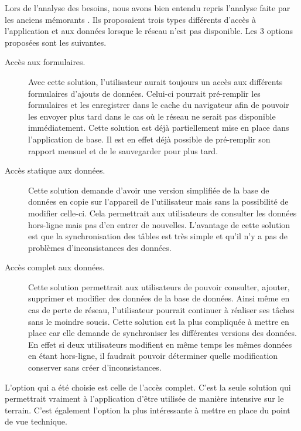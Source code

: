\documentclass{EPL-master-thesis-covers-FR}
\begin{document}
			Lors de l'analyse des besoins, nous avons bien entendu repris l'analyse faite par les anciens mémorants \cite{ref:haitiwater}. Ils proposaient trois types différents d'accès à l'application et aux données lorsque le réseau n'est pas disponible. Les 3 options proposées sont les suivantes. 
			\begin{description}
				\item[Accès aux formulaires.] Avec cette solution, l'utilisateur aurait toujours un accès aux différents formulaires d'ajouts de données. Celui-ci pourrait pré-remplir les formulaires et les enregistrer dans le cache du navigateur afin de pouvoir les envoyer plus tard dans le cas où le réseau ne serait pas disponible immédiatement. Cette solution est déjà partiellement mise en place dans l'application de base. Il est en effet déjà possible de pré-remplir son rapport mensuel et de le sauvegarder pour plus tard. %
				\item[Accès statique aux données.] Cette solution demande d'avoir une version simplifiée de la base de données en copie sur l'appareil de l'utilisateur mais sans la possibilité de modifier celle-ci. Cela permettrait aux utilisateurs de consulter les données hors-ligne mais pas d'en entrer de nouvelles. L'avantage de cette solution est que la synchronisation des tâbles est très simple et qu'il n'y a pas de problèmes d'inconsistances des données.
				\item[Accès complet aux données.] Cette solution permettrait aux utilisateurs de pouvoir consulter, ajouter, supprimer et modifier des données de la base de données. Ainsi même en cas de perte de réseau, l'utilisateur pourrait continuer à réaliser ses tâches sans le moindre soucis. Cette solution est la plus compliquée à mettre en place car elle demande de synchroniser les différentes versions des données. En effet si deux utilisateurs modifient en même temps les mêmes données en étant hors-ligne, il faudrait pouvoir déterminer quelle modification conserver sans créer d'inconsistances.  
			\end{description}
			
			L'option qui a été choisie est celle de l'accès complet. C'est la seule solution qui permettrait vraiment à l'application d'être utilisée de manière intensive sur le terrain. C'est également l'option la plus intéressante à mettre en place du point de vue technique.
			
\end{document}
